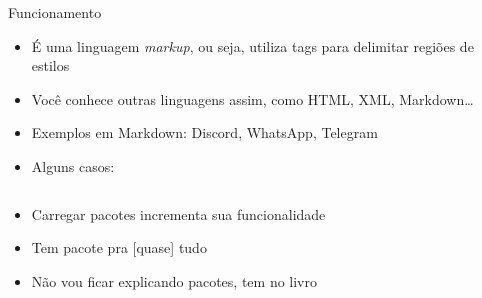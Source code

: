     \begin{frame}{Funcionamento}
        \begin{itemize}[<+->]
            \item É uma linguagem \emph{markup}, ou seja, utiliza tags para delimitar regiões de estilos
            \item Você conhece outras linguagens assim, como HTML, XML, Markdown\dots
            \item Exemplos em Markdown: Discord, WhatsApp, Telegram
            \item Alguns casos:
        \end{itemize}
        \begin{columns}
            \begin{column}{0.5\textwidth}
        		\visible<+->{}
            \end{column}
            \begin{column}{0.5\textwidth}
        		\visible<+->{\fbox{
            		\begin{minipage} [c][0.2\textheight][c] {0.9\textwidth}
                        
            		\end{minipage}
        		}}
            \end{column}
    	\end{columns}
    	{\begin{itemize}[<+->]
    	    \item Carregar pacotes incrementa sua funcionalidade
    	    \item Tem pacote pra [quase] tudo
    	    \item Não vou ficar explicando pacotes, tem no livro
    	\end{itemize}}
    \end{frame}

